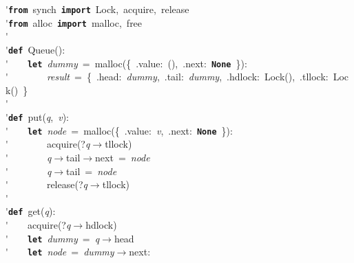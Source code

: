 \'\>\texttt{\textbf{from}}~synch~\texttt{\textbf{import}}~Lock,~acquire,~release\\

\'\>\texttt{\textbf{from}}~alloc~\texttt{\textbf{import}}~malloc,~free\\

\'\>\\

\'\>\texttt{\textbf{def}}~Queue():\\

\'\>~~~~\texttt{\textbf{let}}~\textit{dummy}~=~malloc(\{~.value:~(),~.next:~\texttt{\textbf{None}}~\}):\\

\'\>~~~~~~~~\textit{result}~=~\{~.head:~\textit{dummy},~.tail:~\textit{dummy},~.hdlock:~Lock(),~.tllock:~Lock()~\}\\

\'\>\\

\'\>\texttt{\textbf{def}}~put(\textit{q},~\textit{v}):\\

\'\>~~~~\texttt{\textbf{let}}~\textit{node}~=~malloc(\{~.value:~\textit{v},~.next:~\texttt{\textbf{None}}~\}):\\

\'\>~~~~~~~~acquire(?\textit{q}$\rightarrow$tllock)\\

\'\>~~~~~~~~\textit{q}$\rightarrow$tail$\rightarrow$next~=~\textit{node}\\

\'\>~~~~~~~~\textit{q}$\rightarrow$tail~=~\textit{node}\\

\'\>~~~~~~~~release(?\textit{q}$\rightarrow$tllock)\\

\'\>\\

\'\>\texttt{\textbf{def}}~get(\textit{q}):\\

\'\>~~~~acquire(?\textit{q}$\rightarrow$hdlock)\\

\'\>~~~~\texttt{\textbf{let}}~\textit{dummy}~=~\textit{q}$\rightarrow$head\\

\'\>~~~~\texttt{\textbf{let}}~\textit{node}~=~\textit{dummy}$\rightarrow$next:\\

